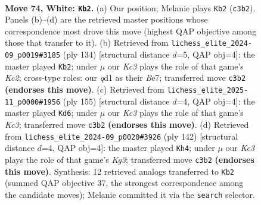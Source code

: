 \documentclass[11pt]{article}
\begin{document}
\clearpage

\begin{figure}[p]\centering
\begin{subfigure}{0.46\textwidth}\centering
\resizebox{\linewidth}{!}{%
\newchessgame
\chessboard[
  setfen={8/8/1p6/p7/2P5/2K4k/8/3q4 w - - 4 74},
  showmover=false,
  pgfstyle=straightmove, color=movearrow, markmove={c3-b2}
]}
\caption{}
\end{subfigure}\hfill
\begin{subfigure}{0.46\textwidth}\centering
\resizebox{\linewidth}{!}{%
\newchessgame
\chessboard[
  setfen={8/4B3/8/1p6/p7/2P5/2K5/6k1 w - - 16 68},
  showmover=false,
  pgfstyle=straightmove, color=movearrow, markmove={c2-b2}
]}
\caption{}
\end{subfigure}
\\[4pt]
\begin{subfigure}{0.46\textwidth}\centering
\resizebox{\linewidth}{!}{%
\newchessgame
\chessboard[
  setfen={8/8/K1k5/2p5/P7/1P6/8/8 b - - 2 78},
  showmover=false,
  pgfstyle=straightmove, color=movearrow, markmove={c6-d6}
]}
\caption{}
\end{subfigure}\hfill
\begin{subfigure}{0.46\textwidth}\centering
\resizebox{\linewidth}{!}{%
\newchessgame
\chessboard[
  setfen={8/8/6p1/3k1p2/5P2/6K1/8/8 w - - 8 72},
  showmover=false,
  pgfstyle=straightmove, color=movearrow, markmove={g3-h4}
]}
\caption{}
\end{subfigure}
\caption{\textbf{Move 74, White: \texttt{Kb2}.} (a) Our position; Melanie plays \texttt{Kb2} (\texttt{c3b2}). Panels (b)--(d) are the retrieved master positions whose correspondence most drove this move (highest QAP objective among those that transfer to it). (b) Retrieved from \texttt{lichess\_elite\_2024-09\_p0019\#3185} (ply 134) [structural distance $d$=5, QAP obj=4]: the master played \texttt{Kb2}; under $\mu$ our \emph{Kc3} plays the role of that game's \emph{Kc2}; cross-type roles: our \emph{q}d1 as their \emph{B}e7; transferred move \texttt{c3b2} \textbf{(endorses this move)}. (c) Retrieved from \texttt{lichess\_elite\_2025-11\_p0000\#1956} (ply 155) [structural distance $d$=4, QAP obj=4]: the master played \texttt{Kd6}; under $\mu$ our \emph{Kc3} plays the role of that game's \emph{Kc3}; transferred move \texttt{c3b2} \textbf{(endorses this move)}. (d) Retrieved from \texttt{lichess\_elite\_2024-09\_p0020\#3926} (ply 142) [structural distance $d$=4, QAP obj=4]: the master played \texttt{Kh4}; under $\mu$ our \emph{Kc3} plays the role of that game's \emph{Kg3}; transferred move \texttt{c3b2} \textbf{(endorses this move)}. Synthesis: 12 retrieved analogs transferred to \texttt{Kb2} (summed QAP objective 37, the strongest correspondence among the candidate moves); Melanie committed it via the \texttt{search} selector.}
\label{fig:thought-m146}
\end{figure}
\end{document}
